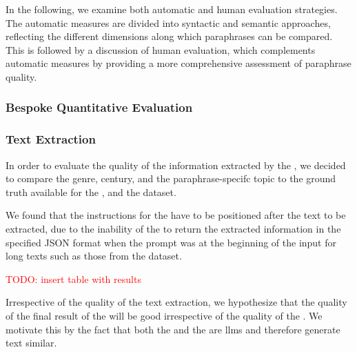 

In the following, we examine both automatic and human evaluation strategies. 
The automatic measures are divided into syntactic and semantic approaches, reflecting the different dimensions along which paraphrases can be compared. 
This is followed by a discussion of human evaluation, which complements automatic measures by providing a more comprehensive assessment of paraphrase quality.




\subsubsection{Bespoke Quantitative Evaluation}
\label{subsec:custom_quantitative_evaluation}

\subsubsection{Text Extraction}
\label{subsec:text_extraction}

In order to evaluate the quality of the information extracted by the \pextractor{}, 
we decided to compare the genre, century, and the paraphrase-specifc topic to the 
ground truth available for the \dataBlog{}, \dataGutenberg{} and the \dataCustom{} dataset.

We found that the instructions for the \pextractor{} have to be positioned after the text to be extracted, 
due to the inability of the \pextractor{} to return the extracted information in the specified JSON format 
when the prompt was at the beginning of the input for long texts such as those from the \dataGutenberg{} dataset.

\textcolor{red}{TODO: insert table with results}

Irrespective of the quality of the text extraction, we hypothesize that the quality of the final result of the \pgenerator{} will be good irrespective of the quality of the \pextractor{}.
We motivate this by the fact that both the \pextractor{} and the \pgenerator{} are \acp{llm} and therefore generate text similar.

